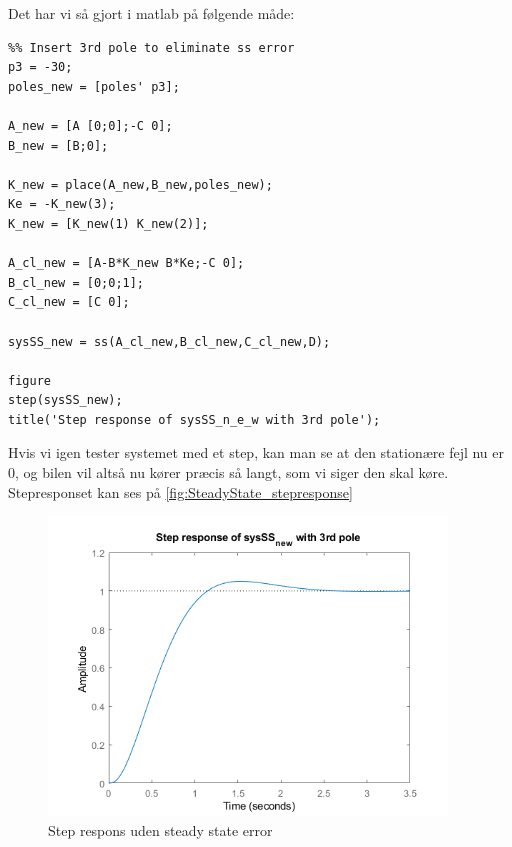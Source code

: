 Det har vi så gjort i matlab på følgende måde:

\begin{lstlisting}
%% Insert 3rd pole to eliminate ss error
p3 = -30;
poles_new = [poles' p3];

A_new = [A [0;0];-C 0];
B_new = [B;0];

K_new = place(A_new,B_new,poles_new);
Ke = -K_new(3);
K_new = [K_new(1) K_new(2)];

A_cl_new = [A-B*K_new B*Ke;-C 0];
B_cl_new = [0;0;1];
C_cl_new = [C 0];

sysSS_new = ss(A_cl_new,B_cl_new,C_cl_new,D);

figure
step(sysSS_new);
title('Step response of sysSS_n_e_w with 3rd pole');
\end{lstlisting}

Hvis vi igen tester systemet med et step, kan man se at den stationære fejl nu er 0, og bilen vil altså nu kører præcis så langt, som vi siger den skal køre. Stepresponset kan ses på \autoref{fig:SteadyState_stepresponse} 

\begin{figure}[H]
	\centering
	\includegraphics[width = 300pt]{Img/StepOfSySS_new.png}
	\caption{Step respons uden steady state error}
	\label{fig:SteadyState_stepresponse}
\end{figure}